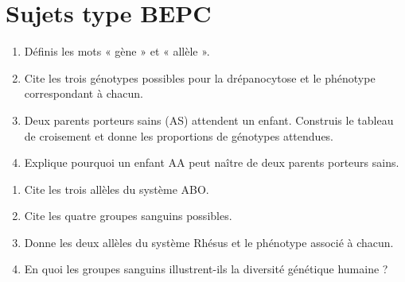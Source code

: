 \section{Sujets type BEPC}

\begin{enumerate}[label=\arabic*)]
\item Définis les mots « gène » et « allèle ».
\item Cite les trois génotypes possibles pour la drépanocytose et le phénotype
correspondant à chacun.
\item Deux parents porteurs sains (AS) attendent un enfant. Construis le tableau de
croisement et donne les proportions de génotypes attendues.
\item Explique pourquoi un enfant AA peut naître de deux parents porteurs sains.
\end{enumerate}

\begin{enumerate}[label=\arabic*)]
\item Cite les trois allèles du système ABO.
\item Cite les quatre groupes sanguins possibles.
\item Donne les deux allèles du système Rhésus et le phénotype associé à chacun.
\item En quoi les groupes sanguins illustrent-ils la diversité génétique humaine ?
\end{enumerate}

